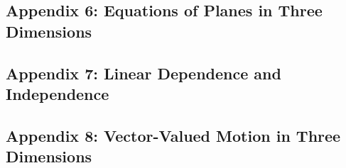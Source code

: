 \documentclass[12pt]{article}
\begin{document}
\newpage
\subsection{Appendix 6: Equations of Planes in Three Dimensions}
\label{app:planes}


\newpage
\subsection{Appendix 7: Linear Dependence and Independence}
\label{app:linear-dependence}


\newpage
\subsection{Appendix 8: Vector-Valued Motion in Three Dimensions}
\label{app:vector-motion}

\end{document}
